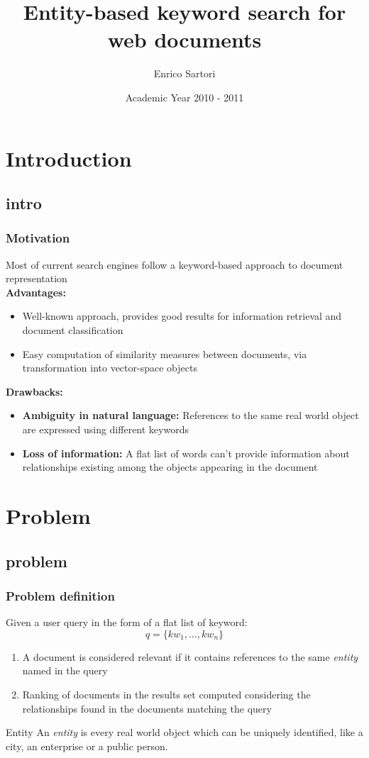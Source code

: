 \documentclass{beamer}
\title{Entity-based keyword search for web documents}
\author{Enrico Sartori}
\date{Academic Year 2010 - 2011}
\institute{University of Trento}
\begin{document}
\begin{frame}
\titlepage
\end{frame}

\section{Introduction}
\subsection{intro}

\begin{frame}
\frametitle{Motivation}
Most of current search engines follow a keyword-based approach to
document representation\\
{\color{red}\bfseries{Advantages:}}\\
\begin{itemize}
\item Well-known approach, provides good results for information
  retrieval and document classification
\item Easy computation of similarity measures between documents, via
  transformation into vector-space objects
\end{itemize}
{\color{red}\bfseries{Drawbacks:}}\\
\begin{itemize}
\item{{\bfseries Ambiguity in natural language:}} References to the same real world
  object are expressed using different keywords
\item{{\bfseries Loss of information:}} A flat list of words can't provide
  information about relationships existing among the objects appearing
  in the document
\end{itemize}
\end{frame}

\section{Problem}
\subsection{problem}

\begin{frame}
\frametitle{Problem definition}
Given a user query in the form of a flat list of keyword:
$$
q = \{kw_{1}, \dots, kw_{n}\}
$$
\begin{enumerate}
\item A document is considered relevant if it contains references to the
same \emph{entity} named in the query
\item Ranking of documents in the results set computed considering
  the relationships found in the documents matching the query
\end{enumerate}
\begin{exampleblock}{Entity}
An \emph{entity} is every real world object which can be uniquely
identified, like a city, an enterprise or a public person.
\end{exampleblock}
\end{frame}
\end{document}
